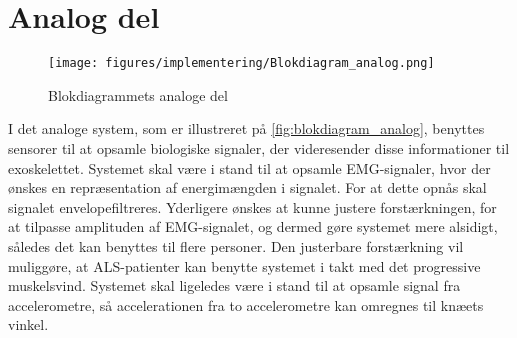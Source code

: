 \section{Analog del} \label{sec:analog_del_krav}
\begin{figure}[H]
\centering
\texttt{[image: figures/implementering/Blokdiagram\_analog.png]}
\caption{Blokdiagrammets analoge del}
\label{fig:blokdiagram_analog}
\end{figure}

\noindent
I det analoge system, som er illustreret på \autoref{fig:blokdiagram_analog}, benyttes sensorer til at opsamle biologiske signaler, der videresender disse informationer til exoskelettet. Systemet skal være i stand til at opsamle EMG-signaler, hvor der ønskes en repræsentation af energimængden i signalet. For at dette opnås skal signalet envelopefiltreres. Yderligere ønskes at kunne justere forstærkningen, for at tilpasse amplituden af EMG-signalet, og dermed gøre systemet mere alsidigt, således det kan benyttes til flere personer. Den justerbare forstærkning vil muliggøre, at ALS-patienter kan benytte systemet i takt med det progressive muskelsvind.
Systemet skal ligeledes være i stand til at opsamle signal fra accelerometre, så accelerationen fra to accelerometre kan omregnes til knæets vinkel.
